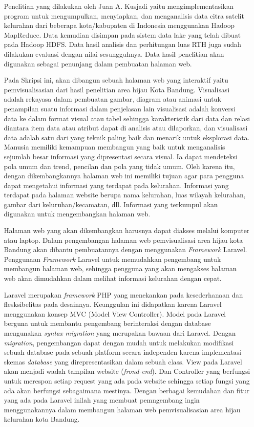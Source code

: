 \documentclass[a4paper,twoside]{article}
\begin{document}
Penelitian yang dilakukan oleh Juan A. Kusjadi yaitu mengimplementasikan program untuk mengumpulkan, menyiapkan, dan menganalisis data
citra satelit kelurahan dari beberapa kota/kabupaten di Indonesia menggunakan Hadoop MapReduce. Data kemudian disimpan pada sistem data lake yang telah dibuat pada Hadoop HDFS. Data hasil analisis dan perhitungan luas RTH juga sudah dilakukan evaluasi dengan nilai sesungguhnya. Data hasil penelitian akan digunakan sebagai penunjang dalam pembuatan halaman web. 

Pada Skripsi ini, akan dibangun sebuah halaman web yang interaktif yaitu pemvisualisasian dari hasil penelitian area hijau Kota Bandung. Visualisasi adalah rekayasa dalam pembuatan gambar, diagram atau animasi untuk penampilan suatu informasi dalam penjelasan lain visualisasi adalah konversi data ke dalam format visual atau tabel sehingga karakteristik dari data dan relasi diantara item data atau atribut dapat di analisis atau dilaporkan, dan visualisasi data adalah satu dari yang teknik paling baik dan menarik untuk eksplorasi data. Manusia memiliki kemampuan membangun yang baik untuk menganalisis sejumlah besar informasi yang dipresentasi secara visual. Ia dapat mendeteksi pola umum dan trend, pencilan dan pola yang tidak umum. Oleh karena itu, dengan dikembangkannya halaman web ini memiliki tujuan agar para pengguna dapat mengetahui informasi yang terdapat pada kelurahan. Informasi yang terdapat pada halaman website berupa nama kelurahan, luas wilayah kelurahan, gambar dari keluruhan/kecamatan, dll. Informasi yang terkumpul akan digunakan untuk mengembangkan halaman web.


Halaman web yang akan dikembangkan harusnya dapat diakses melalui komputer atau laptop. Dalam pengembangan halaman web pemvisualisasi area hijau kota Bandung akan dibantu pembuatannya dengan menggunakan \emph{Framework} Laravel. Penggunaan \textit{Framework} Laravel untuk memudahkan pengembang untuk membangun halaman web, sehingga pengguna yang akan mengakses halaman web akan dimudahkan dalam melihat informasi kelurahan dengan cepat. 

Laravel merupakan \textit{framework} PHP yang menekankan pada kesederhanaan dan flesksibelitas pada desainnya. Keunggulan ini didapatkan karena Laravel menggunakan konsep MVC (Model View Controller). Model pada Laravel berguna untuk membantu pengembang berinteraksi dengan database mengunakan \textit{syntax migration} yang merupakan bawaan dari Laravel. Dengan \textit{migration}, pengembangan dapat dengan mudah untuk melakukan modifikasi sebuah database pada sebuah platform secara independen karena implementasi skemas \textit{database} yang direpresentasikan dalam sebuah class. View pada Laravel akan menjadi wadah tampilan website (\textit{frond-end}). Dan Controller yang berfungsi untuk merespon setiap request yang ada pada website sehingga setiap fungsi yang ada akan berfungsi sebagaimana mestinya. Dengan berbagai kemudahan dan fitur yang ada pada Laravel inilah yang membuat pemngembang ingin menggunakannya dalam membangun halaman web pemvisualisasian area hijau kelurahan kota Bandung.
\end{document}
